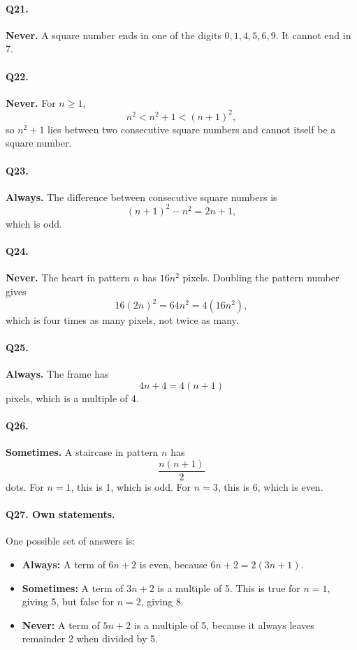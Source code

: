 \documentclass[11pt,a4paper]{article}
\begin{document}
\paragraph{Q21.} \textbf{Never.} A square number ends in one of the digits \(0,1,4,5,6,9\). It cannot end in 7.

\paragraph{Q22.} \textbf{Never.} For \(n\ge 1\),
\[
n^2<n^2+1<(n+1)^2,
\]
so \(n^2+1\) lies between two consecutive square numbers and cannot itself be a square number.

\paragraph{Q23.} \textbf{Always.} The difference between consecutive square numbers is
\[
(n+1)^2-n^2=2n+1,
\]
which is odd.

\paragraph{Q24.} \textbf{Never.} The heart in pattern \(n\) has \(16n^2\) pixels. Doubling the pattern number gives
\[
16(2n)^2=64n^2=4(16n^2),
\]
which is four times as many pixels, not twice as many.

\paragraph{Q25.} \textbf{Always.} The frame has
\[
4n+4=4(n+1)
\]
pixels, which is a multiple of 4.

\paragraph{Q26.} \textbf{Sometimes.} A staircase in pattern \(n\) has
\[
\frac{n(n+1)}{2}
\]
dots. For \(n=1\), this is 1, which is odd. For \(n=3\), this is 6, which is even.

\paragraph{Q27. Own statements.}
One possible set of answers is:
\begin{itemize}
\item \textbf{Always:} A term of \(6n+2\) is even, because \(6n+2=2(3n+1)\).
\item \textbf{Sometimes:} A term of \(3n+2\) is a multiple of 5. This is true for \(n=1\), giving 5, but false for \(n=2\), giving 8.
\item \textbf{Never:} A term of \(5n+2\) is a multiple of 5, because it always leaves remainder 2 when divided by 5.
\end{itemize}
\end{document}
